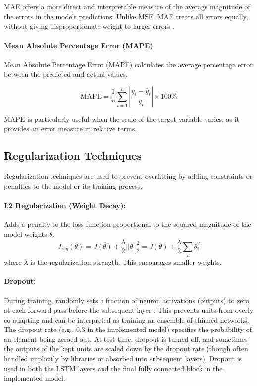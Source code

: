 \begin{appendices}
  MAE offers a more direct and interpretable measure of the average magnitude of the errors in the models predictions. Unlike MSE, MAE treats all errors equally, without giving disproportionate weight to larger errors \autocite{fahrmeir2016statistik}.

  \paragraph{\textbf{Mean Absolute Percentage Error (MAPE)}}
  Mean Absolute Percentage Error (MAPE) calculates the average percentage error between the predicted and actual values.

  \begin{equation}
    \text{MAPE} = \frac{1}{n} \sum_{i=1}^{n} \left| \frac{y_i - \hat{y}_i}{y_i} \right| \times 100\%
  \end{equation}

  MAPE is particularly useful when the scale of the target variable varies, as it provides an error measure in relative terms.

  \subsection{Regularization Techniques}
  Regularization techniques are used to prevent overfitting by adding constraints or penalties to the model or its training process.

  \paragraph{L2 Regularization (Weight Decay):}
  Adds a penalty to the loss function proportional to the squared magnitude of the model weights \( \theta \).
  \begin{equation}
    J_{reg}(\theta) = J(\theta) + \frac{\lambda}{2} ||\theta||_2^2 = J(\theta) + \frac{\lambda}{2} \sum_i \theta_i^2
  \end{equation}
  where \( \lambda \) is the regularization strength. This encourages smaller weights.

  \paragraph{Dropout:}
  During training, randomly sets a fraction of neuron activations (outputs) to zero at each forward pass before the subsequent layer \autocite{srivastava2014dropout}. This prevents units from overly co-adapting and can be interpreted as training an ensemble of thinned networks. The dropout rate (e.g., 0.3 in the implemented model) specifies the probability of an element being zeroed out. At test time, dropout is turned off, and sometimes the outputs of the kept units are scaled down by the dropout rate (though often handled implicitly by libraries or absorbed into subsequent layers). Dropout is used in both the LSTM layers and the final fully connected block in the implemented model.


\end{appendices}
